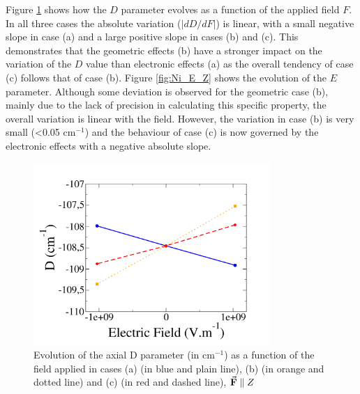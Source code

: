 \documentclass[12pt]{report}
\numberwithin{equation}{section}
\begin{document}

Figure \ref{fig:Ni_D_Z} shows how the $D$ parameter evolves as a function of the applied field $F$.
In all three cases the absolute variation ($|dD/dF|$) is linear, with a small negative slope in case (a) and a large positive slope in cases (b) and (c).
This demonstrates that the geometric effects (b) have a stronger impact on the variation of the $D$ value than electronic effects (a) as the overall tendency of case (c) follows that of case (b).
Figure \ref{fig:Ni_E_Z} shows the evolution of the $E$ parameter.
Although some deviation is observed for the geometric case (b), mainly due to the lack of precision in calculating this specific property, the overall variation is linear with the field.
However, the variation in case (b) is very small (<0.05 cm$^{-1}$) and the behaviour of case (c) is now governed by the electronic effects with a negative absolute slope.

\begin{figure}[!ht]
    \centering
    \includegraphics[width=0.8\textwidth]{Images/D_E_Z.png}
	\caption[Evolution of the axial D parameter as a function of the field applied in cases (a), (b) and (c) for $\vec{\vb{F}}\parallel Z$]{Evolution of the axial D parameter (in cm$^{-1}$) as a function of the field applied in cases (a) (in blue and plain line), (b) (in orange and dotted line) and (c) (in red and dashed line), $\vec{\vb F}\parallel Z$}
    \label{fig:Ni_D_Z}
\end{figure}
\end{document}
